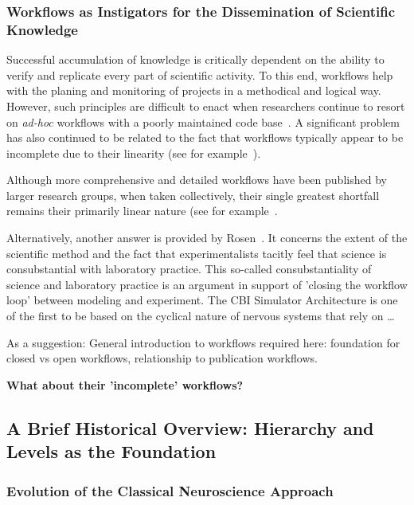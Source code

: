 \documentclass[10pt,letterpaper]{article}
\begin{document}
\subsubsection*{Workflows as Instigators for the Dissemination of Scientific Knowledge}

Successful accumulation of knowledge is critically dependent on the ability to verify and replicate every part of scientific activity. To this end, workflows help with the planing and monitoring of projects in a methodical and logical way.  However, such principles are difficult to enact when researchers continue to resort on {\textit{ad-hoc}} workflows with a poorly maintained code base~\cite{kubilius13}. A significant problem has also continued to be related to the fact that workflows typically appear to be incomplete due to their linearity (see for example~\cite{eriksson22,stockton15}).

Although more comprehensive and detailed workflows have been published by larger research groups, when taken collectively, their single greatest shortfall remains their primarily linear nature (see for example~\cite{levenstein23,fan19}.

Alternatively, another answer is provided by Rosen~\cite{rosen96}. It concerns the extent of the scientific method and the fact 
that experimentalists tacitly feel that science is consubstantial with laboratory practice. This so-called consubstantiality of science and laboratory practice is an argument in support of 'closing the workflow loop' between modeling and experiment. The CBI Simulator Architecture is one of the first to be based on the cyclical nature of nervous systems that rely on \ldots

As a suggestion: General introduction to workflows required here: foundation for closed vs open workflows, relationship to publication workflows.

{\bf What about their 'incomplete' workflows?}

\subsection*{A Brief Historical Overview: Hierarchy and Levels as the Foundation}

\subsubsection*{Evolution of the Classical Neuroscience Approach}
\end{document}
